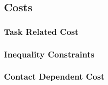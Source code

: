 \documentclass[main.tex]{subfiles}
\begin{document}
\begin{comment}
This formulation enables explicit enforcement of physical constraints such as contact complementarity by treating velocities as control variables. For instance, assigning a high cost to velocities at inactive contacts discourages motion in those regions, effectively ensuring that contacts are only active when physically meaningful.

The update to the timestamp is given by:
\begin{equation}
    t_{k+1} = t_k + \tau_k
\end{equation}

The state update for each end-effector’s position and orientation is governed by the basic kinematic relations:
\begin{equation}
    \mathbf{p}_{l,k+1} = \mathbf{p}_{l,k} + \mathbf{v}_{l,k} \tau_k
\end{equation}
\begin{equation}
    \mathbf{q}_{l,k+1} = \mathcal{Q}(\boldsymbol{\omega}_{l,k}, \tau_k) \cdot \mathbf{q}_{l,k}
\end{equation}

Here, $\mathcal{Q}(\boldsymbol{\omega}_{l,k}, \tau_k)$ represents the quaternion corresponding to the angular displacement over the time interval $\tau_k$, computed from the angular velocity $\boldsymbol{\omega}_{l,k}$.

Integrating all these elements, the complete system dynamics are compactly expressed as a state transition function:
\begin{equation}
    x_{k+1} = f(x_k, u_k)
\end{equation}

This function encapsulates both the kinematics and dynamics of the system, allowing for predictive simulation or optimization over multiple time steps.
\end{comment}



\subsection{Costs}
\subsubsection{Task Related Cost}
\subsubsection{Inequality Constraints}
\subsubsection{Contact Dependent Cost}
\end{document}
